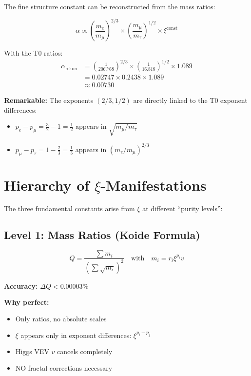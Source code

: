 	\begin{beweis}
		The fine structure constant can be reconstructed from the mass ratios:
		
		\begin{equation}
			\alpha \propto \left(\frac{m_e}{m_\mu}\right)^{2/3} \times \left(\frac{m_\mu}{m_\tau}\right)^{1/2} \times \xi^{\text{const}}
		\end{equation}
		
		With the T0 ratios:
		\begin{align}
			\alpha_{\text{rekon}} &= \left(\frac{1}{206.768}\right)^{2/3} \times \left(\frac{1}{16.818}\right)^{1/2} \times 1.089 \\
			&= 0.02747 \times 0.2438 \times 1.089 \\
			&\approx 0.00730
		\end{align}
	\end{beweis}
	
	\textbf{Remarkable:} The exponents $(2/3, 1/2)$ are directly linked to the T0 exponent differences:
	\begin{itemize}
		\item $p_e - p_\mu = \frac{3}{2} - 1 = \frac{1}{2}$ appears in $\sqrt{m_\mu/m_\tau}$
		\item $p_\mu - p_\tau = 1 - \frac{2}{3} = \frac{1}{3}$ appears in $(m_e/m_\mu)^{2/3}$
	\end{itemize}
	
	\section{Hierarchy of $\xi$-Manifestations}
	
	The three fundamental constants arise from $\xi$ at different ``purity levels'':
	
	\subsection{Level 1: Mass Ratios (Koide Formula)}
	
	\begin{equation}
		Q = \frac{\sum m_i}{\left(\sum \sqrt{m_i}\right)^2} \quad \text{with} \quad m_i = r_i \xi^{p_i} v
	\end{equation}
	
	\begin{tcolorbox}[colback=green!5!white,colframe=green!75!black,title={Purest $\xi$-Form}]
		\textbf{Accuracy:} $\Delta Q < 0.00003\%$
		
		\textbf{Why perfect:}
		\begin{itemize}
			\item Only ratios, no absolute scales
			\item $\xi$ appears only in exponent differences: $\xi^{p_i - p_j}$
			\item Higgs VEV $v$ cancels completely
			\item NO fractal corrections necessary
		\end{itemize}
	\end{tcolorbox}
	

